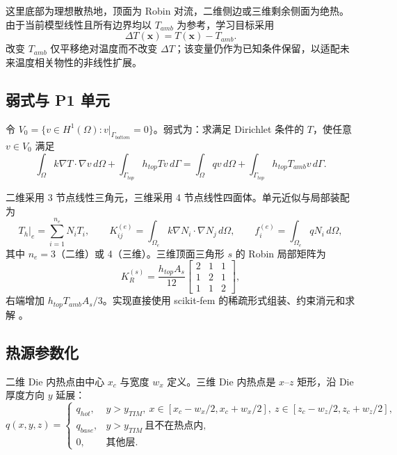\documentclass[11pt,a4paper]{article}
\newcommand{\dT}{\Delta T}
\begin{document}
这里底部为理想散热地，顶面为 Robin 对流，二维侧边或三维剩余侧面为绝热。由于当前模型线性且所有边界均以 $T_{amb}$ 为参考，学习目标采用
\begin{equation}
\dT(\mathbf{x})=T(\mathbf{x})-T_{amb}.
\end{equation}
改变 $T_{amb}$ 仅平移绝对温度而不改变 $\dT$；该变量仍作为已知条件保留，以适配未来温度相关物性的非线性扩展。

\subsection{弱式与 P1 单元}
令 $V_0=\{v\in H^1(\Omega):v|_{\Gamma_{bottom}}=0\}$。弱式为：求满足 Dirichlet 条件的 $T$，使任意 $v\in V_0$ 满足
\begin{equation}
\int_\Omega k\nabla T\cdot\nabla v\,d\Omega+
\int_{\Gamma_{top}}h_{top}Tv\,d\Gamma=
\int_\Omega qv\,d\Omega+
\int_{\Gamma_{top}}h_{top}T_{amb}v\,d\Gamma.
\label{eq:weak}
\end{equation}

二维采用 3 节点线性三角元，三维采用 4 节点线性四面体。单元近似与局部装配为
\begin{equation}
T_h|_{e}=\sum_{i=1}^{n_e}N_iT_i,\qquad
K^{(e)}_{ij}=\int_{\Omega_e}k\nabla N_i\cdot\nabla N_j\,d\Omega,\qquad
f_i^{(e)}=\int_{\Omega_e}qN_i\,d\Omega,
\end{equation}
其中 $n_e=3$（二维）或 4（三维）。三维顶面三角形 $s$ 的 Robin 局部矩阵为
\begin{equation}
K^{(s)}_{R}=\frac{h_{top}A_s}{12}
\begin{bmatrix}2&1&1\\1&2&1\\1&1&2\end{bmatrix},
\end{equation}
右端增加 $h_{top}T_{amb}A_s/3$。实现直接使用 scikit-fem 的稀疏形式组装、约束消元和求解 \cite{skfem}。

\subsection{热源参数化}
二维 Die 内热点由中心 $x_c$ 与宽度 $w_x$ 定义。三维 Die 内热点是 $x$--$z$ 矩形，沿 Die 厚度方向 $y$ 延展：
\begin{equation}
q(x,y,z)=\begin{cases}
q_{hot},& y>y_{TIM},\ x\in[x_c-w_x/2,x_c+w_x/2],\ z\in[z_c-w_z/2,z_c+w_z/2],\\
q_{base},& y>y_{TIM}\ \text{且不在热点内},\\
0,& \text{其他层}.
\end{cases}
\label{eq:hotspot}
\end{equation}
\end{document}
